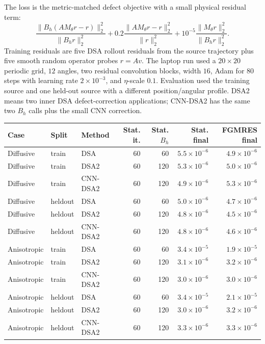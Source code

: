 \documentclass[11pt]{article}
\begin{document}
The loss is the metric-matched defect objective with a small physical residual
term:
\[
  \frac{\|B_h(AM_\theta r-r)\|_2^2}{\|B_hr\|_2^2}
  +0.2\frac{\|AM_\theta r-r\|_2^2}{\|r\|_2^2}
  +10^{-5}\frac{\|M_\theta r\|_2^2}{\|B_hr\|_2^2}.
\]
Training residuals are five DSA rollout residuals from the source trajectory
plus five smooth random operator probes \(r=Av\).  The laptop run used a
\(20\times20\) periodic grid, \(12\) angles, two residual convolution blocks,
width \(16\), Adam for \(80\) steps with learning rate \(2\times10^{-3}\), and
\(\eta\)-scale \(0.1\).  Evaluation used the training source and one held-out
source with a different position/angular profile.  DSA2 means two inner DSA
defect-correction applications; CNN-DSA2 has the same two \(B_h\) calls plus
the small CNN correction.

\begin{table}[t]
\centering
\scriptsize
\begin{tabular}{lllrrrr}
\toprule
Case & Split & Method & Stat. it. & Stat. \(B_h\) & Stat. final & FGMRES final\\
\midrule
Diffusive & train & DSA & 60 & 60 & \(5.5{\times}10^{-6}\) & \(4.9{\times}10^{-6}\)\\
Diffusive & train & DSA2 & 60 & 120 & \(5.3{\times}10^{-6}\) & \(5.0{\times}10^{-6}\)\\
Diffusive & train & CNN-DSA2 & 60 & 120 & \(4.9{\times}10^{-6}\) & \(5.3{\times}10^{-6}\)\\
Diffusive & heldout & DSA & 60 & 60 & \(5.0{\times}10^{-6}\) & \(4.7{\times}10^{-6}\)\\
Diffusive & heldout & DSA2 & 60 & 120 & \(4.8{\times}10^{-6}\) & \(4.5{\times}10^{-6}\)\\
Diffusive & heldout & CNN-DSA2 & 60 & 120 & \(4.8{\times}10^{-6}\) & \(4.6{\times}10^{-6}\)\\
Anisotropic & train & DSA & 60 & 60 & \(3.4{\times}10^{-5}\) & \(1.9{\times}10^{-5}\)\\
Anisotropic & train & DSA2 & 60 & 120 & \(3.1{\times}10^{-6}\) & \(3.2{\times}10^{-6}\)\\
Anisotropic & train & CNN-DSA2 & 60 & 120 & \(3.0{\times}10^{-6}\) & \(3.0{\times}10^{-6}\)\\
Anisotropic & heldout & DSA & 60 & 60 & \(3.4{\times}10^{-5}\) & \(2.1{\times}10^{-5}\)\\
Anisotropic & heldout & DSA2 & 60 & 120 & \(3.0{\times}10^{-6}\) & \(3.2{\times}10^{-6}\)\\
Anisotropic & heldout & CNN-DSA2 & 60 & 120 & \(3.3{\times}10^{-6}\) & \(3.3{\times}10^{-6}\)\\

\end{tabular}
\end{table}
\end{document}
